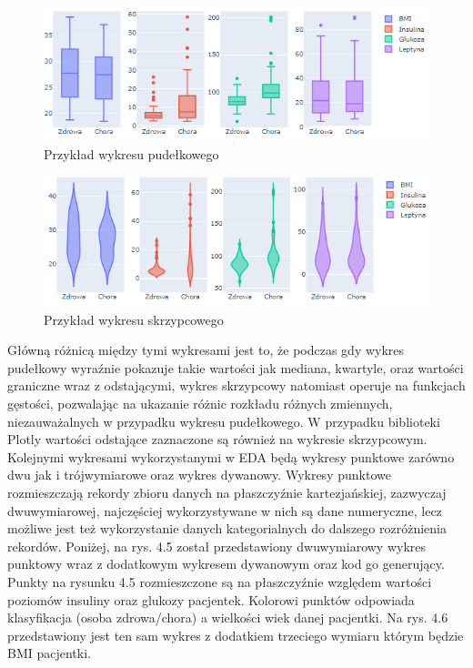 \documentclass[a4paper,12pt,oneside]{book}
\begin{document}
\begin{figure}[h]
\centering
\includegraphics[scale=0.9]{pxboxshow.png}
\caption{Przykład wykresu pudełkowego }
\end{figure}

\begin{figure}[h]
\centering
\includegraphics[scale=0.9]{pxviolinshow.png}
\caption{Przykład wykresu skrzypcowego }
\end{figure}

Główną różnicą między tymi wykresami jest to, że podczas gdy wykres pudełkowy wyraźnie pokazuje takie wartości jak mediana, kwartyle, oraz wartości graniczne wraz z odstającymi, wykres skrzypcowy natomiast operuje na funkcjach gęstości, pozwalając na ukazanie różnic rozkładu różnych zmiennych, niezauważalnych w przypadku wykresu pudełkowego. W przypadku biblioteki Plotly wartości odstające zaznaczone są również na wykresie skrzypcowym. Kolejnymi wykresami wykorzystanymi w EDA będą wykresy punktowe zarówno dwu jak i trójwymiarowe oraz wykres dywanowy. Wykresy punktowe rozmieszczają rekordy zbioru danych na płaszczyźnie kartezjańskiej, zazwyczaj dwuwymiarowej, najczęściej wykorzystywane w nich są dane numeryczne, lecz możliwe jest też wykorzystanie danych kategorialnych do dalszego rozróżnienia rekordów. Poniżej, na rys. 4.5 został przedstawiony dwuwymiarowy wykres punktowy wraz z dodatkowym wykresem dywanowym oraz kod go generujący.
Punkty na rysunku 4.5 rozmieszczone są na płaszczyźnie względem wartości poziomów insuliny oraz glukozy pacjentek. Kolorowi punktów odpowiada klasyfikacja (osoba zdrowa/chora) a wielkości wiek danej pacjentki. Na rys. 4.6 przedstawiony jest ten sam wykres z dodatkiem trzeciego wymiaru którym będzie BMI pacjentki.
\end{document}
